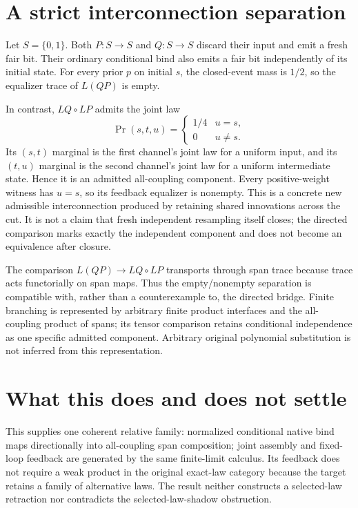 \documentclass[11pt]{article}
\begin{document}
\section{A strict interconnection separation}
Let $S=\{0,1\}$. Both $P:S\to S$ and $Q:S\to S$ discard their input and emit a fresh fair bit. Their ordinary conditional bind also emits a fair bit independently of its initial state. For every prior $p$ on initial $s$, the closed-event mass is $1/2$, so the equalizer trace of $L(QP)$ is empty.

In contrast, $LQ\circ LP$ admits the joint law
\[
 \Pr(s,t,u)=\begin{cases}1/4&u=s,\\0&u\ne s.\end{cases}
\]
Its $(s,t)$ marginal is the first channel's joint law for a uniform input, and its $(t,u)$ marginal is the second channel's joint law for a uniform intermediate state. Hence it is an admitted all-coupling component. Every positive-weight witness has $u=s$, so its feedback equalizer is nonempty. This is a concrete new admissible interconnection produced by retaining shared innovations across the cut. It is not a claim that fresh independent resampling itself closes; the directed comparison marks exactly the independent component and does not become an equivalence after closure.

The comparison $L(QP)\to LQ\circ LP$ transports through span trace because trace acts functorially on span maps. Thus the empty/nonempty separation is compatible with, rather than a counterexample to, the directed bridge. Finite branching is represented by arbitrary finite product interfaces and the all-coupling product of spans; its tensor comparison retains conditional independence as one specific admitted component. Arbitrary original polynomial substitution is not inferred from this representation.

\section{What this does and does not settle}
This supplies one coherent relative family: normalized conditional native bind maps directionally into all-coupling span composition; joint assembly and fixed-loop feedback are generated by the same finite-limit calculus. Its feedback does not require a weak product in the original exact-law category because the target retains a family of alternative laws. The result neither constructs a selected-law retraction nor contradicts the selected-law-shadow obstruction.
\end{document}
